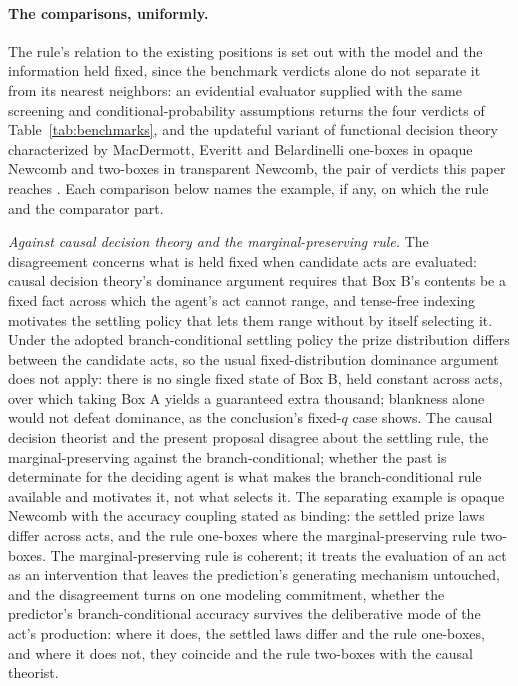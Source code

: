 \paragraph{The comparisons, uniformly.}\label{sec:locating} The rule's relation to the existing positions is set out with the model and the information held fixed, since the benchmark verdicts alone do not separate it from its nearest neighbors: an evidential evaluator supplied with the same screening and conditional-probability assumptions returns the four verdicts of Table~\ref{tab:benchmarks}, and the updateful variant of functional decision theory characterized by MacDermott, Everitt and Belardinelli one-boxes in opaque Newcomb and two-boxes in transparent Newcomb, the pair of verdicts this paper reaches \cite{macdermott2023characterising}. Each comparison below names the example, if any, on which the rule and the comparator part.

\textit{Against causal decision theory and the marginal-preserving rule.} The disagreement concerns what is held fixed when candidate acts are evaluated: causal decision theory's dominance argument requires that Box B's contents be a fixed fact across which the agent's act cannot range, and tense-free indexing motivates the settling policy that lets them range without by itself selecting it. Under the adopted branch-conditional settling policy the prize distribution differs between the candidate acts, so the usual fixed-distribution dominance argument does not apply: there is no single fixed state of Box B, held constant across acts, over which taking Box A yields a guaranteed extra thousand; blankness alone would not defeat dominance, as the conclusion's fixed-$q$ case shows. The causal decision theorist and the present proposal disagree about the settling rule, the marginal-preserving against the branch-conditional; whether the past is determinate for the deciding agent is what makes the branch-conditional rule available and motivates it, not what selects it. The separating example is opaque Newcomb with the accuracy coupling stated as binding: the settled prize laws differ across acts, and the rule one-boxes where the marginal-preserving rule two-boxes. The marginal-preserving rule is coherent; it treats the evaluation of an act as an intervention that leaves the prediction's generating mechanism untouched, and the disagreement turns on one modeling commitment, whether the predictor's branch-conditional accuracy survives the deliberative mode of the act's production: where it does, the settled laws differ and the rule one-boxes, and where it does not, they coincide and the rule two-boxes with the causal theorist.

